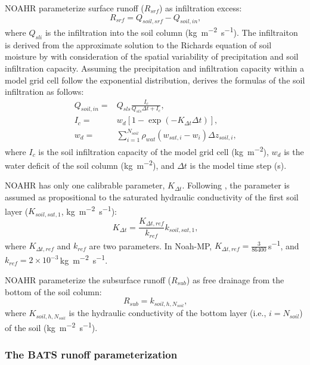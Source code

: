 \documentclass[essd]{copernicus}
\begin{document}
NOAHR parameterize surface runoff (\(R_{srf}\)) as infiltration excess:
\begin{equation}
  R_{srf} = Q_{soil,srf} - Q_{soil,in} \text{,}
\end{equation}
where \(Q_{sli}\) is the infiltration into the soil column
(\si{kg~m^{-2}~s^{-1}}). The infiltraiton is derived from the approximate
solution to the Richards equation of soil moisture by \citet{philip1969AiH} with
consideration of the spatial variability of precipitation and soil infiltration
capacity. Assuming the precipitation and infiltration capacity within a model
grid cell follow the exponential distribution, \citet{schaake1996JGRA} derives
the formulas of the soil infiltration as follows:
\begin{align}
  Q_{soil,in} = & Q_{sls} \frac{I_c}{Q_{sls} \Delta t + I_c} \text{,} \\
  I_{c} =       & w_d [1-\exp(-K_{\Delta t} \Delta t)] \text{,} \\
  w_d =         & \sum_{i=1}^{N_{soil}} \rho_{wat} (w_{sat,i} - w_i) \Delta z_{soil,i}
  \text{,}
\end{align}
where \(I_{c}\) is the soil infiltration capacity of the model grid cell
(\si{kg~m^{-2}}), \(w_d\) is the water deficit of the soil column
(\si{kg~m^{-2}}), and \(\Delta t\) is the model time step (\si{s}).

NOAHR has only one calibrable parameter, \(K_{\Delta t}\). Following
\citet{chen2001MWR}, the parameter is assumed as propositional to the saturated
hydraulic conductivity of the first soil layer (\(K_{soil,sat,1}\),
\si{kg~m^{-2}~s^{-1}}):
\begin{equation}
  K_{\Delta t} = \frac{{K}_{\Delta t, ref}}{k_{ref}} k_{soil,sat,1} \text{,}
\end{equation}
where $K_{\Delta t,ref}$ and \(k_{ref}\) are two parameters. In Noah-MP,
\(K_{\Delta t,ref} = \frac{3}{86400}\)\,\si{s^{-1}}, and \(k_{ref}=2 \times
10^{-3}\)\,\si{kg~m^{-2}~s^{-1}}.

NOAHR parameterize the subsurface runoff (\(R_{sub}\)) as free drainage from the
bottom of the soil column:
\begin{equation}
  R_{sub} = k_{soil,h,N_{soil}} \label{eq:NOAHR:rsub} \text{,}
\end{equation}
where \(K_{soil,h,N_{soil}}\) is the hydraulic conductivity of the bottom layer
(i.e., \(i=N_{soil}\)) of the soil (\si{kg~m^{-2}~s^{-1}}).


\subsubsection{The BATS runoff parameterization}
\end{document}
